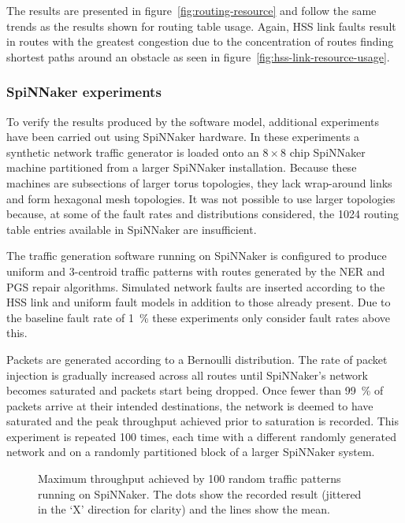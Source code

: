 				The results are presented in figure~\ref{fig:routing-resource} and
				follow the same trends as the results shown for routing table usage.
				Again, HSS link faults result in routes with the greatest congestion
				due to the concentration of routes finding shortest paths around an
				obstacle as seen in figure~\ref{fig:hss-link-resource-usage}.
			
			\subsubsection{SpiNNaker experiments}
			
				To verify the results produced by the software model, additional
				experiments have been carried out using SpiNNaker hardware. In these
				experiments a synthetic network traffic generator is loaded onto an
				$8\times8$ chip SpiNNaker machine partitioned from a larger SpiNNaker
				installation.  Because these machines are subsections of larger torus
				topologies, they lack wrap-around links and form hexagonal mesh
				topologies. It was not possible to use larger topologies because, at
				some of the fault rates and distributions considered, the \num{1024}
				routing table entries available in SpiNNaker are insufficient.
				
				The traffic generation software running on SpiNNaker is configured to
				produce uniform and 3-centroid traffic patterns with routes generated
				by the NER and PGS repair algorithms. Simulated network faults are
				inserted according to the HSS link and uniform fault models in addition
				to those already present. Due to the baseline fault rate of
				\SI{1}{\percent} these experiments only consider fault rates above
				this.
				
				Packets are generated according to a Bernoulli distribution. The rate
				of packet injection is gradually increased across all routes until
				SpiNNaker's network becomes saturated and packets start being dropped.
				Once fewer than \SI{99}{\percent} of packets arrive at their intended
				destinations, the network is deemed to have saturated and the peak
				throughput achieved prior to saturation is recorded. This experiment is
				repeated 100 times, each time with a different randomly generated
				network and on a randomly partitioned block of a larger SpiNNaker
				system.
				
				\begin{figure}
					\center
					
					\caption[Maximum throughput achieved on SpiNNaker.]%
					{Maximum throughput achieved by \num{100} random traffic
					patterns running on SpiNNaker. The dots show the recorded result
					(jittered in the `X' direction for clarity) and the lines show the
					mean.}
					\label{fig:routing-hardware}
				\end{figure}
				

